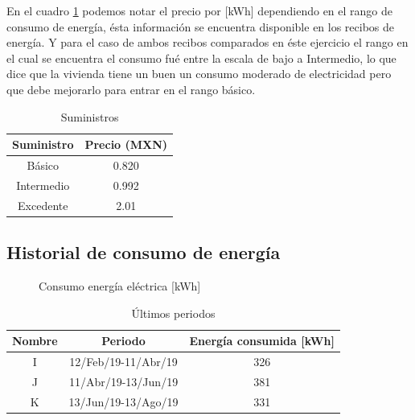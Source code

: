 \documentclass[]{article}
\begin{document}
En el cuadro \ref{cuadro:suministros} podemos notar el precio por [kWh] dependiendo en el rango de consumo de energía, ésta información se encuentra disponible en los recibos de energía. Y para el caso de ambos recibos comparados en éste ejercicio el rango en el cual se encuentra el consumo fué entre la escala de bajo a Intermedio, lo que dice que la vivienda tiene un buen un consumo moderado de electricidad pero que debe mejorarlo para entrar en el rango básico.\\

\begin{table}[h!]
	\centering
	\begin{tabular}[]{||c|c||}
		\hline
		 Suministro & Precio (MXN)\\
		 	\hline\hline
		 Básico & 0.820 \\
		 \hline
		 Intermedio & 0.992 \\
		 \hline
		 Excedente & 2.01 \\
		\hline
	\end{tabular}
	\caption{Suministros}
	\label{cuadro:suministros}	
\end{table}



\subsection{Historial de consumo de energía}

\begin{figure}[h!]
	\centering
	\caption{Consumo energía eléctrica [kWh]}
	\label{fig:grafConsumo}
\end{figure}


\begin{table}[h!]
	\centering
	\begin{tabular}[]{||c|c|c||}
		\hline
		Nombre & Periodo & Energía consumida [kWh]\\
		\hline\hline
		I & 12/Feb/19-11/Abr/19 & 326 \\
		\hline
		J & 11/Abr/19-13/Jun/19 & 381 \\
		\hline
		K & 13/Jun/19-13/Ago/19 & 331 \\
		\hline
	\end{tabular}
	\caption{Últimos periodos}
    \label{cuadro:ultimosPeriodos}
\end{table}
\end{document}
